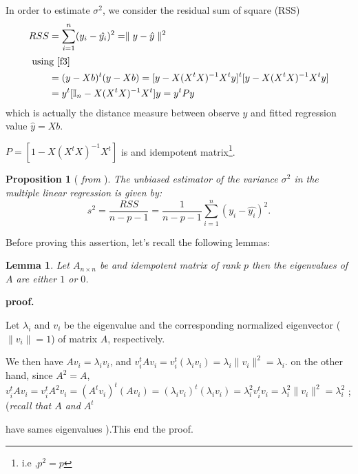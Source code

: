 \documentclass[12pt]{report}
\newtheorem {lemme}{Lemma} %
\newtheorem {proposition}{Proposition}[section]  %
\begin{document}
	In order to estimate $\sigma^{2}$, we consider the residual sum of square (RSS)
	\begin{align*}
		RSS &=\sum_{i=1}^{n}(y_{i}-\hat{y_{i}})^{2}
		=\parallel y-\hat{y}\parallel ^{2}\\
		\intertext{ using \eqref{f3} }
		&=(y-Xb)^{t}(y-Xb)=[y-X(X^{t}X)^{-1}X^{t}y]^{t}[y-X(X^{t}X)^{-1}X^{t}y]\\
		&=y^{t}[\mathbb{I}_{n}-X(X^{t}X)^{-1}X^{t}]y
		=y^{t}Py
	\end{align*}
	which is actually the distance measure between observe $y$ and fitted regression value $\hat{y}=Xb$.
	
	$P=[1-X(X^{t}X)^{-1}X^{t}]$ is and idempotent matrix\footnote{i.e ,$p^{2}=p$}.
	\begin{proposition}[ \textit{ from \cite{ref4}} ]
		The unbiased estimator of the variance $\sigma^{2}$ in the multiple linear regression is given by:
		\begin{equation}
			s^{2}=\frac{RSS}{n-p-1}=\frac{1}{n-p-1}\sum_{i=1}^{n}(y_{i}-\hat{y_{i}})^{2}.
			\label{f4}
		\end{equation}
	\end{proposition}
	Before proving this assertion, let's recall the following lemmas:
	\begin{lemme}
		Let $A_{n\times n}$ be and idempotent matrix of rank $p$ then the eigenvalues of $A$ are either $1$ or $0$.
	\end{lemme}
	\textbf{proof.}
	{\selectfont
		Let $\lambda_{i}$ and $v_{i}$ be the eigenvalue and the corresponding normalized eigenvector ($\parallel v_{i}\parallel=1$) of matrix $A$, respectively.
		
		We then have $Av_{i}=\lambda_{i}v_{i}$, and $v_{i}^{t}Av_{i}=v_{i}^{t}(\lambda_{i}v_{i})=\lambda_{i}\parallel v_{i}\parallel^{2}=\lambda_{i}$. on the other hand, since $A^{2}=A$, 
		$v_{i}^{t}Av_{i}=v_{i}^{t}A^{2}v_{i}=(A^{t}v_{i})^{t}(Av_{i})=(\lambda_{i}v_{i})^{t}(\lambda_{i}v_{i})=\lambda_{i}^{2}v_{i}^{t}v_{i}=\lambda_{i}^{2}\parallel v_{i}\parallel^{2}=\lambda_{i}^{2}$  ; (\textit{recall that $A$ and $A^{t}$}} have sames eigenvalues ).This end the proof.
	
\end{document}

